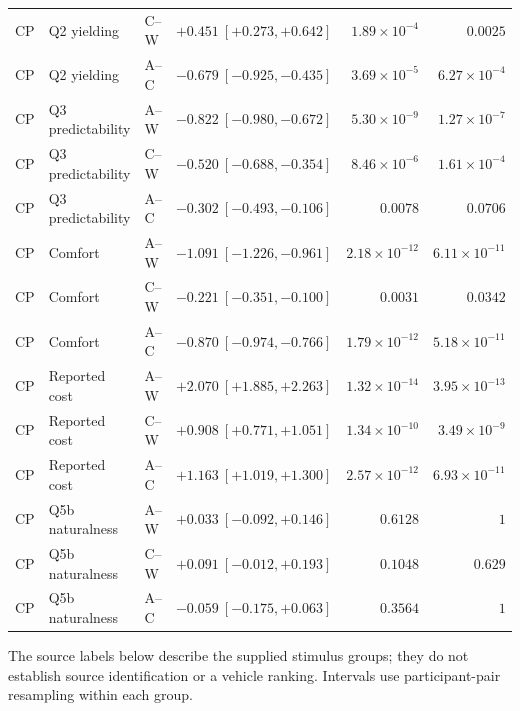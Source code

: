 \begin{longtable}{lllrrr}
CP & Q2 yielding & C--W & $+0.451\ [+0.273,+0.642]$ & $1.89\!\times\!10^{-4}$ & $0.0025$ \\
CP & Q2 yielding & A--C & $-0.679\ [-0.925,-0.435]$ & $3.69\!\times\!10^{-5}$ & $6.27\!\times\!10^{-4}$ \\
CP & Q3 predictability & A--W & $-0.822\ [-0.980,-0.672]$ & $5.30\!\times\!10^{-9}$ & $1.27\!\times\!10^{-7}$ \\
CP & Q3 predictability & C--W & $-0.520\ [-0.688,-0.354]$ & $8.46\!\times\!10^{-6}$ & $1.61\!\times\!10^{-4}$ \\
CP & Q3 predictability & A--C & $-0.302\ [-0.493,-0.106]$ & $0.0078$ & $0.0706$ \\
CP & Comfort & A--W & $-1.091\ [-1.226,-0.961]$ & $2.18\!\times\!10^{-12}$ & $6.11\!\times\!10^{-11}$ \\
CP & Comfort & C--W & $-0.221\ [-0.351,-0.100]$ & $0.0031$ & $0.0342$ \\
CP & Comfort & A--C & $-0.870\ [-0.974,-0.766]$ & $1.79\!\times\!10^{-12}$ & $5.18\!\times\!10^{-11}$ \\
CP & Reported cost & A--W & $+2.070\ [+1.885,+2.263]$ & $1.32\!\times\!10^{-14}$ & $3.95\!\times\!10^{-13}$ \\
CP & Reported cost & C--W & $+0.908\ [+0.771,+1.051]$ & $1.34\!\times\!10^{-10}$ & $3.49\!\times\!10^{-9}$ \\
CP & Reported cost & A--C & $+1.163\ [+1.019,+1.300]$ & $2.57\!\times\!10^{-12}$ & $6.93\!\times\!10^{-11}$ \\
CP & Q5b naturalness & A--W & $+0.033\ [-0.092,+0.146]$ & $0.6128$ & $1$ \\
CP & Q5b naturalness & C--W & $+0.091\ [-0.012,+0.193]$ & $0.1048$ & $0.629$ \\
CP & Q5b naturalness & A--C & $-0.059\ [-0.175,+0.063]$ & $0.3564$ & $1$ \\
\end{longtable}
\endgroup


The source labels below describe the supplied stimulus groups; they do not establish source identification or a vehicle ranking. Intervals use participant-pair resampling within each group.

